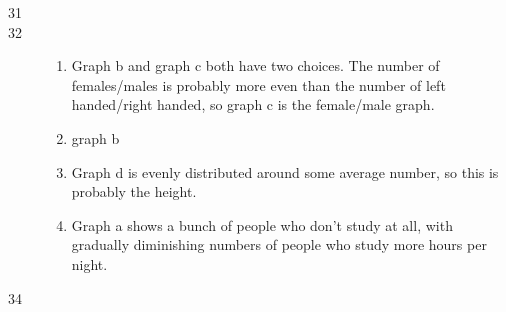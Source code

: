 \documentclass{exam}
\begin{document}
\begin{description}
      \item[31]

      \item[32]
        \begin{enumerate}
          \item Graph b and graph c both have two choices.  The number of females/males is probably more even than the
            number of left handed/right handed, so graph c is the female/male graph.

          \item graph b

          \item Graph d is evenly distributed around some average number, so this is probably the height.

          \item Graph a shows a bunch of people who don't study at all, with gradually diminishing numbers of people who
            study more hours per night.
        \end{enumerate}

      \item[34]
\end{description}
\end{document}
